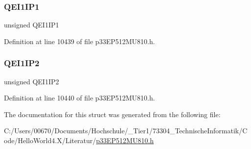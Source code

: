 \subsubsection{\texorpdfstring{Q\+E\+I1\+I\+P1}{QEI1IP1}}
{\footnotesize\ttfamily unsigned Q\+E\+I1\+I\+P1}



Definition at line 10439 of file p33\+E\+P512\+M\+U810.\+h.

\mbox{\label{structtag_i_p_c14_b_i_t_s_af70f5ccd8c4d9df5b6248b494c885e1a}} 
\subsubsection{\texorpdfstring{Q\+E\+I1\+I\+P2}{QEI1IP2}}
{\footnotesize\ttfamily unsigned Q\+E\+I1\+I\+P2}



Definition at line 10440 of file p33\+E\+P512\+M\+U810.\+h.



The documentation for this struct was generated from the following file\+:\begin{DoxyCompactItemize}
\item 
C\+:/\+Users/00670/\+Documents/\+Hochschule/\+\_\+\+Tier1/73304\+\_\+\+Technische\+Informatik/\+Code/\+Hello\+World4.\+X/\+Literatur/\hyperlink{p33_e_p512_m_u810_8h}{p33\+E\+P512\+M\+U810.\+h}\end{DoxyCompactItemize}
